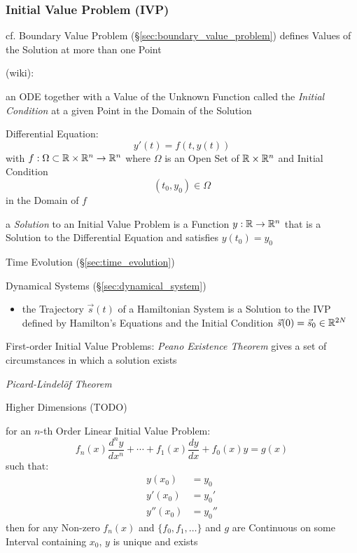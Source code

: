 \subsubsection{Initial Value Problem (IVP)}\label{sec:ivp}

\fist cf. Boundary Value Problem (\S\ref{sec:boundary_value_problem}) defines
Values of the Solution at more than one Point

(wiki):

an ODE together with a Value of the Unknown Function called the \emph{Initial
  Condition} at a given Point in the Domain of the Solution

Differential Equation:
\[
  y'(t) = f(t, y(t))
\]
with $f : \Omega \subset \mathbb{R} \times \mathbb{R}^n \rightarrow \mathbb{R}^n$ where
$\Omega$ is an Open Set of $\mathbb{R} \times \mathbb{R}^n$ and Initial Condition
\[
  (t_0, y_0) \in \Omega
\]
in the Domain of $f$

a \emph{Solution} to an Initial Value Problem is a Function $y : \mathbb{R}
\rightarrow \mathbb{R}^n$ that is a Solution to the Differential Equation and
satisfies $y(t_0) = y_0$

\fist Time Evolution (\S\ref{sec:time_evolution})

\fist Dynamical Systems (\S\ref{sec:dynamical_system})

\begin{itemize}
  \item the Trajectory $\vec{s}(t)$ of a Hamiltonian System is a Solution to
    the IVP defined by Hamilton's Equations and the Initial Condition
    $\vec{s}(0) = \vec{s}_0 \in \mathbb{R}^{2N}$
\end{itemize}

First-order Initial Value Problems: \emph{Peano Existence Theorem} gives a set
of circumstances in which a solution exists

\emph{Picard-Lindel\"of Theorem}

Higher Dimensions (TODO)

for an $n$-th Order Linear Initial Value Problem:
\[
  f_n(x)\frac{d^ny}{dx^n} + \cdots + f_1(x)\frac{dy}{dx} + f_0(x)y = g(x)
\]
such that:
\begin{align*}
  y(x_0)   & = y_0   \\
  y'(x_0)  & = y_0'  \\
  y''(x_0) & = y_0''
\end{align*}
then for any Non-zero $f_n(x)$ and $\{f_0,f_1,\ldots\}$ and $g$ are Continuous
on some Interval containing $x_0$, $y$ is unique and exists




